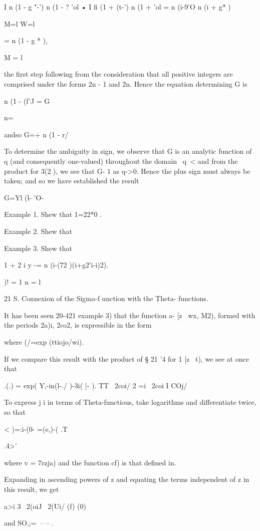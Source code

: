 I n (1 - g "-') n (1 - ? 'ol • I fi (1 + (t-') n (1 + 'ol = n (i-9'O n
(i + g* )

M=l W=l

= n (1 - g * ),

M = l

the first step following from the consideration that all positive
integers are comprised under the forms 2n - 1 and 2n. Hence the
equation determining G is

n (1 - (f'J = G\

n=\

andso G=+ n (1 - r/

%
%

To determine the ambiguity in sign, we observe that G is an analytic
function of q (and consequently one-valued) throughout the domain \ q\
< \; and from the product for 3(2 ), we see that G- 1 as q->0. Hence
the plus sign must always be taken; and so we have established the
result

G=Yl (l- 'O-

Example 1. Shew that 1=22*0 .

Example 2. Shew that

Example 3. Shew that

1 + 2 i y -= n (i-(72 )(i+g2'i-i)2).

)! = 1 n = l

21 S. Connexion of the Sigma-f unction with the Theta- functions.

It has been seen 20-421 example 3) that the function a- [z \ wx, M2),
formed with the periods 2a)i, 2co2, is expressible in the form

where (/=exp (ttiojo/wi).

If we compare this result with the product of § 21 '4 for 1 [z \ t),
we see at once that

.(.) = exp( Y,-in(l-./ )-3i( |- ). TT \ 2coi/ 2 =i \ 2coi I COj/

To express j i in terms of Theta-functious, take logarithms and
differentiate twice, so that

 < )=:i-(0- =(e,)-( .T

.4>'

where v = 7rzja) and the function cf) is that defined in.

Expanding in ascending powers of z and equating the terms independent
of z in this result, we get

a>i 3 \ 2(oiJ \ 2(Ui/ (f) (0)

and SO,;=\ -- -- .

